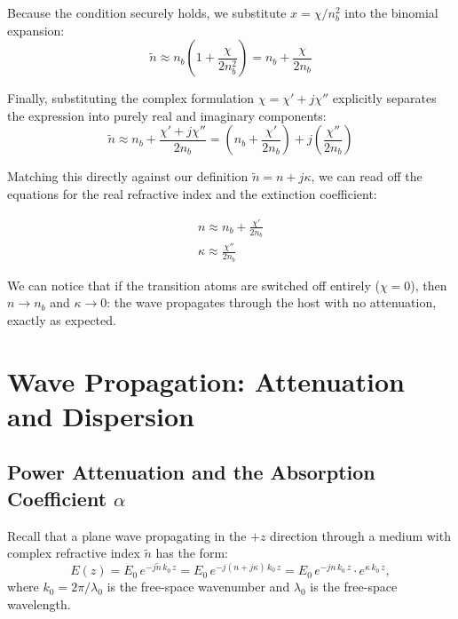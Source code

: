 Because the condition securely holds, we substitute $x = \chi / n_b^2$ into the binomial expansion:
\begin{equation*}
    \tilde{n} \approx n_b\!\left(1 + \frac{\chi}{2n_b^2}\right) = n_b + \frac{\chi}{2n_b}
\end{equation*}

Finally, substituting the complex formulation $\chi = \chi' + j\chi''$ explicitly separates the expression into purely real and imaginary components:
\begin{equation*}
    \tilde{n} \approx n_b + \frac{\chi' + j\chi''}{2n_b} = \left(n_b + \frac{\chi'}{2n_b}\right) + j\left(\frac{\chi''}{2n_b}\right)
\end{equation*}

Matching this directly against our definition $\tilde{n} = n + j\kappa$, we can read off the equations for the real refractive index and the extinction coefficient:

\begin{keyresult}
    \begin{gather}
        n      \approx n_b + \frac{\chi'}{2n_b} \\[1ex]
        \kappa \approx \frac{\chi''}{2n_b}
    \end{gather}
\end{keyresult}

We can notice that if the transition atoms are switched off entirely ($\chi = 0$), then $n \to n_b$ and $\kappa \to 0$: the wave propagates through the host with no attenuation, exactly as expected.

\section{Wave Propagation: Attenuation and Dispersion}


\subsection{Power Attenuation and the Absorption Coefficient \texorpdfstring{$\alpha$}{α}}

Recall that a plane wave propagating in the $+z$ direction through a medium with complex refractive index $\tilde{n}$ has the form:
\begin{equation*}
    E(z) = E_0\,e^{-j\tilde{n}\,k_0\,z} = E_0\,e^{-j(n + j\kappa)\,k_0\,z} = E_0\,e^{-jn\,k_0\,z}\cdot e^{\kappa\,k_0\,z},
\end{equation*}
where $k_0 = 2\pi/\lambda_0$ is the free-space wavenumber and $\lambda_0$ is the free-space wavelength.

